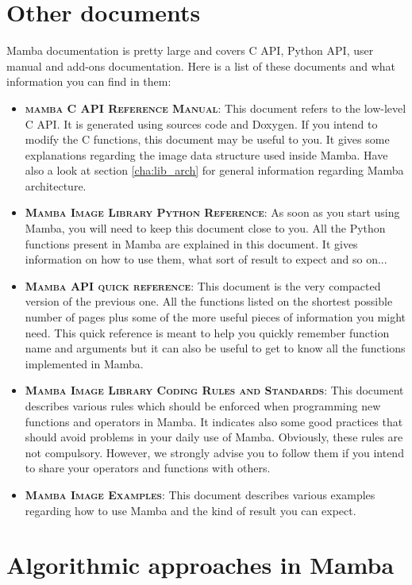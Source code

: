 \documentclass[a4paper,10pt,oneside]{article}
\begin{document}
\section{Other documents}
\label{cha:other_docs}

Mamba documentation is pretty large and covers C API, Python API, user manual 
and add-ons documentation. Here is a list of these documents and what 
information you can find in them:

\begin{itemize}
\item \textbf{\textsc{mamba C API Reference Manual}}: This document refers to the
low-level C API. It is generated using sources code and Doxygen. If you intend 
to modify the C functions, this document may be useful to you. It gives some
explanations regarding the image data structure used inside Mamba. Have also
a look at section \ref{cha:lib_arch} for general information regarding Mamba
architecture.
\item \textbf{\textsc{Mamba Image Library Python Reference}}: As soon as you
start using Mamba, you will need to keep this document close to you. All the
Python functions present in Mamba are explained in this document. It gives
information on how to use them, what sort of result to expect and so on... 
\item \textbf{\textsc{Mamba API quick reference}}: This document is the very
compacted version of the previous one. All the functions listed on the shortest
possible number of pages plus some of the more useful pieces of information you
might need. This quick reference is meant to help you quickly remember function
name and arguments but it can also be useful to get to know all the functions
implemented in Mamba.
\item \textbf{\textsc{Mamba Image Library Coding Rules and Standards}}: This
document describes various rules which should be enforced when programming new
functions and operators in Mamba. It indicates also some good practices that
should avoid problems in your daily use of Mamba. Obviously, these rules are not
compulsory. However, we strongly advise you to follow them if you intend to share
your operators and functions with others.
\item \textbf{\textsc{Mamba Image Examples}}: This document describes various
examples regarding how to use Mamba and the kind of result you can expect.
\end{itemize}

\pagebreak

\section{Algorithmic approaches in Mamba}
\end{document}
